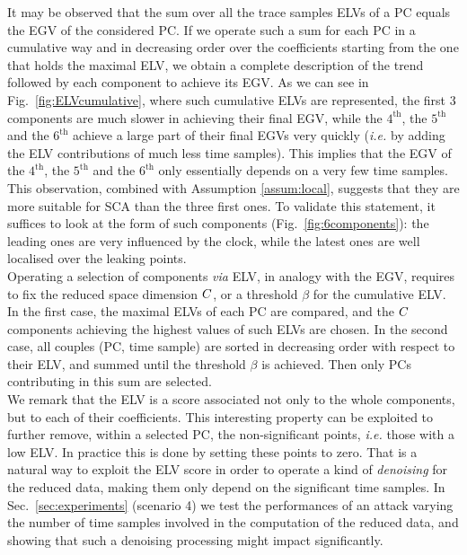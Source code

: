 It may be observed that the sum over all the trace samples ELVs of a PC equals the EGV of the considered PC. If we operate such a sum for each PC in a cumulative way and in decreasing order over the coefficients starting from the one that holds the maximal ELV, we obtain a complete description of the trend followed by each component to achieve its EGV. As we can see in Fig.~\ref{fig:ELVcumulative}, where such cumulative ELVs are represented, the first 3 components are much slower in achieving their final EGV, while the $4^\text{th}$, the $5^\text{th}$ and the $6^\text{th}$ achieve a large part of their final EGVs very quickly ({\em i.e.} by adding the ELV contributions of much less time samples). This implies that the EGV of the $4^\text{th}$, the $5^\text{th}$ and the $6^\text{th}$ only essentially depends on a very few time samples. This observation, combined with Assumption \ref{assum:local}, suggests that they are more suitable for SCA than the three first ones. To validate this statement, it suffices to look at the form of such components (Fig.~\ref{fig:6components}): the leading ones are very influenced by the clock, while the latest ones are well localised over the leaking points.\\

Operating a selection of components {\em via} ELV, in analogy with the EGV, requires to fix the reduced space dimension $C$, or a threshold $\beta$ for the cumulative ELV. In the first case, the maximal ELVs of each PC are compared, and the $C$ components achieving the highest values of such ELVs are chosen. In the second case, all couples (PC, time sample) are sorted in decreasing order with respect to their ELV, and summed until the threshold $\beta$ is achieved. Then only PCs contributing in this sum are selected. \\

We remark that the ELV is a score associated not only to the whole components, but to each of their coefficients. This interesting property can be exploited to further remove, within a selected PC, the non-significant points, {\em i.e.} those with a low ELV. In practice this is done by setting these points to zero. That is a natural way to exploit the ELV score in order to operate a kind of {\em denoising} for the reduced data, making them only depend  on the significant time samples. In Sec.~\ref{sec:experiments} (scenario 4) we test the performances of an attack varying the number of time samples involved in the computation of the reduced data, and showing that such a denoising processing might impact significantly. 
 


